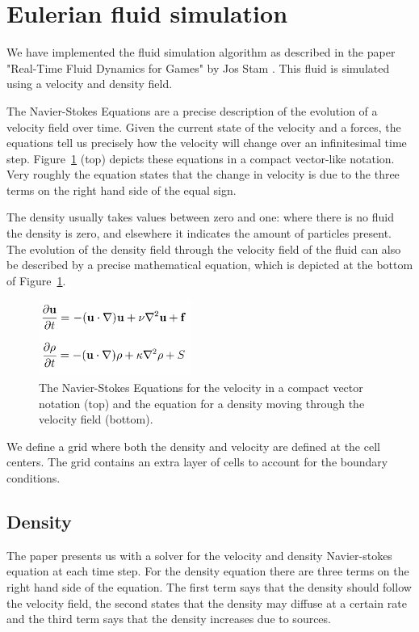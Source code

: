 \section{Eulerian fluid simulation}

We have implemented the fluid simulation algorithm as described in the paper "Real-Time Fluid Dynamics for Games" by Jos Stam \cite{stable}.
This fluid is simulated using a velocity and density field.

\noindent The Navier-Stokes Equations are a precise description of the evolution of a velocity field over time.
Given the current state of the velocity and a forces, the equations tell us precisely how the velocity will change over an infinitesimal time step.
Figure~\ref{fig:navierstokes} (top) depicts these equations in a compact vector-like notation.
Very roughly the equation states that the change in velocity is due to the three terms on the right hand side of the equal sign.

\noindent The density usually takes values between zero and one: where there is no fluid the density is zero, and elsewhere it indicates the amount of particles present.
The evolution of the density field through the velocity field of the fluid can also be described by a precise mathematical equation,
which is depicted at the bottom of Figure~\ref{fig:navierstokes}.

\begin{figure}[h]
    \centering
    \includegraphics[width=5cm]{img/navierstokes.png}
    \caption{The Navier-Stokes Equations for the velocity in a compact vector notation (top) and the equation for a density moving through the velocity field (bottom).}
    \label{fig:navierstokes}
\end{figure}

\noindent We define a grid where both the density and velocity are defined at the cell centers.
The grid contains an extra layer of cells to account for the boundary conditions.

\subsection{Density}
The paper presents us with a solver for the velocity and density Navier-stokes equation at each time step.
For the density equation there are three terms on the right hand side of the equation.
The first term says that the density should follow the velocity field, the second states that the density may diffuse at a certain rate and the third term says that the density increases due to sources.

